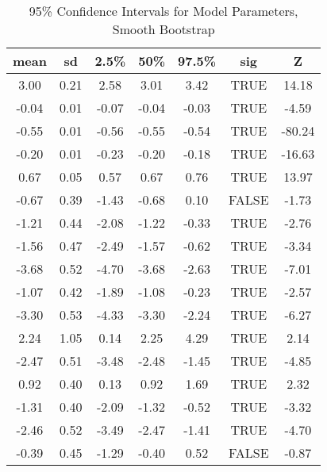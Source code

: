 \begin{table}[hbp!]
\centering
\begin{tabular}{|c|c|c|c|c|c|c|}
  \hline
  \textbf{mean} & \textbf{sd} & \textbf{2.5\%} & \textbf{50\%} & \textbf{97.5\%} & \textbf{sig} & \textbf{Z} \\ 
  \hline
3.00 & 0.21 & 2.58 & 3.01 & 3.42 & TRUE & 14.18 \\ 
  -0.04 & 0.01 & -0.07 & -0.04 & -0.03 & TRUE & -4.59 \\ 
  -0.55 & 0.01 & -0.56 & -0.55 & -0.54 & TRUE & -80.24 \\ 
  -0.20 & 0.01 & -0.23 & -0.20 & -0.18 & TRUE & -16.63 \\ 
  0.67 & 0.05 & 0.57 & 0.67 & 0.76 & TRUE & 13.97 \\ 
  -0.67 & 0.39 & -1.43 & -0.68 & 0.10 & FALSE & -1.73 \\ 
  -1.21 & 0.44 & -2.08 & -1.22 & -0.33 & TRUE & -2.76 \\ 
  -1.56 & 0.47 & -2.49 & -1.57 & -0.62 & TRUE & -3.34 \\ 
  -3.68 & 0.52 & -4.70 & -3.68 & -2.63 & TRUE & -7.01 \\ 
  -1.07 & 0.42 & -1.89 & -1.08 & -0.23 & TRUE & -2.57 \\ 
  -3.30 & 0.53 & -4.33 & -3.30 & -2.24 & TRUE & -6.27 \\ 
  2.24 & 1.05 & 0.14 & 2.25 & 4.29 & TRUE & 2.14 \\ 
  -2.47 & 0.51 & -3.48 & -2.48 & -1.45 & TRUE & -4.85 \\ 
  0.92 & 0.40 & 0.13 & 0.92 & 1.69 & TRUE & 2.32 \\ 
  -1.31 & 0.40 & -2.09 & -1.32 & -0.52 & TRUE & -3.32 \\ 
  -2.46 & 0.52 & -3.49 & -2.47 & -1.41 & TRUE & -4.70 \\ 
  -0.39 & 0.45 & -1.29 & -0.40 & 0.52 & FALSE & -0.87 \\ 
   \hline
\end{tabular}
\caption{95\% Confidence Intervals for Model Parameters, Smooth Bootstrap}
\end{table}
